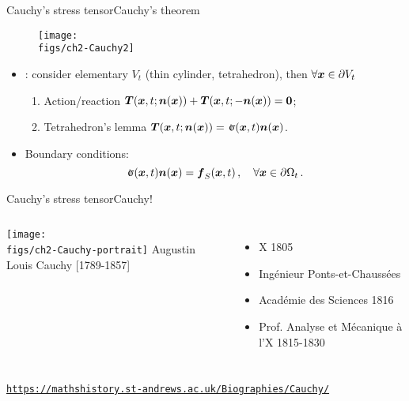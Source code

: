 \begin{frame}{Cauchy's stress tensor}{Cauchy's theorem}

\begin{figure}
\centering\texttt{[image: \\figs/ch2-Cauchy2]}
\end{figure}
\begin{itemize}
\item{}: consider elementary $V_t$ (thin cylinder, tetrahedron), then $\forall{\boldsymbol{x}}\in\partial V_t$
\begin{enumerate}
\item Action/reaction ${\boldsymbol{T}}({\boldsymbol{x}},t;{\boldsymbol{n}}({\boldsymbol{x}}))+{\boldsymbol{T}}({\boldsymbol{x}},t;-{\boldsymbol{n}}({\boldsymbol{x}}))={\bf 0}$;
\item Tetrahedron's lemma $\Tv(\xv,t;\nv(\xv))=\stress(\xv,t)\nv(\xv)$.
\end{enumerate}
\item Boundary conditions:
\begin{displaymath}
\stress(\xv,t)\nv(\xv)=\fv_S(\xv,t)\,,\quad\forall\xv\in\partial\medium_t\,.
\end{displaymath}
\end{itemize}

\end{frame}

\begin{frame}{Cauchy's stress tensor}{Cauchy!}

\begin{columns}[t]
\centering\texttt{[image: \\figs/ch2-Cauchy-portrait]}
\vskip-100pt
Augustin Louis Cauchy [1789-1857]
\begin{itemize}
\item X 1805
\item Ing\'enieur Ponts-et-Chauss\'ees
\item Acad\'emie des Sciences 1816
\item Prof. Analyse et M\'ecanique \`a l'X 1815-1830
\end{itemize}
\end{columns}
\href{https://mathshistory.st-andrews.ac.uk/Biographies/Cauchy/}{\tiny\texttt{https://mathshistory.st-andrews.ac.uk/Biographies/Cauchy/}}

\end{frame}

